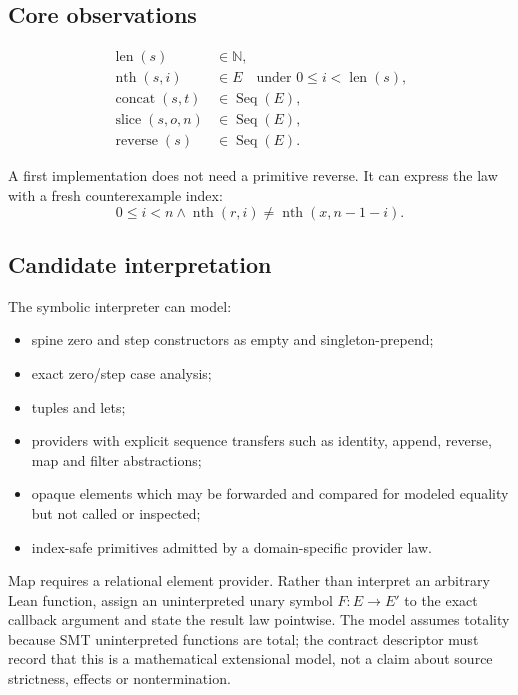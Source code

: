 \documentclass[11pt,oneside]{report}
\newcommand{\Nat}{\mathbb{N}}
\begin{document}
\subsection{Core observations}

\begin{align*}
\operatorname{len}(s) &\in \Nat,\\
\operatorname{nth}(s,i) &\in E \quad\text{under }0\le i<\operatorname{len}(s),\\
\operatorname{concat}(s,t) &\in \operatorname{Seq}(E),\\
\operatorname{slice}(s,o,n) &\in \operatorname{Seq}(E),\\
\operatorname{reverse}(s) &\in \operatorname{Seq}(E).
\end{align*}

A first implementation does not need a primitive reverse. It can express the law with a fresh counterexample index:
\[
0\le i<n \land \operatorname{nth}(r,i)\ne
\operatorname{nth}(x,n-1-i).
\]

\subsection{Candidate interpretation}

The symbolic interpreter can model:

\begin{itemize}[leftmargin=2em]
\item spine zero and step constructors as empty and singleton-prepend;
\item exact zero/step case analysis;
\item tuples and lets;
\item providers with explicit sequence transfers such as identity, append, reverse, map and filter abstractions;
\item opaque elements which may be forwarded and compared for modeled equality but not called or inspected;
\item index-safe primitives admitted by a domain-specific provider law.
\end{itemize}

Map requires a relational element provider. Rather than interpret an arbitrary Lean function, assign an uninterpreted unary symbol $F:E\to E'$ to the exact callback argument and state the result law pointwise. The model assumes totality because SMT uninterpreted functions are total; the contract descriptor must record that this is a mathematical extensional model, not a claim about source strictness, effects or nontermination.
\end{document}
